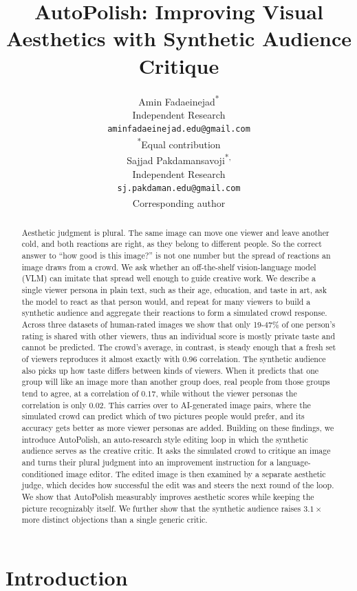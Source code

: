 \documentclass{article}
\title{AutoPolish: Improving Visual Aesthetics with Synthetic Audience Critique}
\author{%
  Amin Fadaeinejad\textsuperscript{*}\\
  Independent Research\\
  \texttt{aminfadaeinejad.edu@gmail.com}\\
  {\normalfont\small\textsuperscript{*}Equal contribution}\\
  \And
  Sajjad Pakdamansavoji\textsuperscript{*,\dag}\\
  Independent Research\\
  \texttt{sj.pakdaman.edu@gmail.com}\\
  {\normalfont\small\textsuperscript{\dag}Corresponding author}\\
}
\begin{document}
\maketitle


\begin{abstract}
Aesthetic judgment is plural. The same image can move one viewer and leave another cold, and both reactions are right, as they belong to different people. So the correct answer to ``how good is this image?'' is not one number but the spread of reactions an image draws from a crowd. We ask whether an off-the-shelf vision-language model (VLM) can imitate that spread well enough to guide creative work. We describe a single viewer persona in plain text, such as their age, education, and taste in art, ask the model to react as that person would, and repeat for many viewers to build a synthetic audience and aggregate their reactions to form a simulated crowd response. Across three datasets of human-rated images we show that only 19-47\% of one person's rating is shared with other viewers, thus an individual score is mostly private taste and cannot be predicted. The crowd's average, in contrast, is steady enough that a fresh set of viewers reproduces it almost exactly with 0.96 correlation. The synthetic audience also picks up how taste differs between kinds of viewers. When it predicts that one group will like an image more than another group does, real people from those groups tend to agree, at a correlation of $0.17$, while without the viewer personas the correlation is only $0.02$. This carries over to AI-generated image pairs, where the simulated crowd can predict which of two pictures people would prefer, and its accuracy gets better as more viewer personas are added. Building on these findings, we introduce AutoPolish, an auto-research style editing loop in which the synthetic audience serves as the creative critic. It asks the simulated crowd to critique an image and turns their plural judgment into an improvement instruction for a language-conditioned image editor. The edited image is then examined by a separate aesthetic judge, which decides how successful the edit was and steers the next round of the loop. We show that AutoPolish measurably improves aesthetic scores while keeping the picture recognizably itself. We further show that the synthetic audience raises $3.1\times$ more distinct objections than a single generic critic.
\end{abstract}


\section{Introduction}
\end{document}
